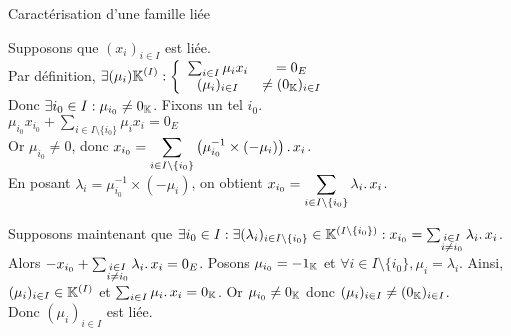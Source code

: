 \documentclass{article}
\renewenvironment{question_kholle}[2][ ]
{
	\subsection{\texorpdfstring{#2}{}}
	\notblank{#1}
	{
		\noindent #1
		\bigbreak
	}
	{}
	\begin{proof}
}
{
	\end{proof}
}
\begin{document}
\begin{question_kholle}
	[Une famille est liée si et seulement si l'un de ses vecteurs est une combinaison linéaires d'autres vecteurs de la famille.
		\begin{equation}
			(x_i)_{i \in I} \text{ est liée}
			\iff \exists i_0 \in I : \exists (\lambda_i)_{i \in I\setminus\{i_0\}} \in \K^{\left( I \setminus \{i_0\} \right)} :
			x_{i_0} = \sum_{\substack{i \in I \\ i \neq i_0}} \lambda_i \ldotp x_i
		\end{equation}]
	{Caractérisation d'une famille liée}

	Supposons que $(x_i)_{i \in I}$ est liée. \\
	Par définition, $\displaystyle \exists (\mu_i) \mathbb K^{(I)} :
		\left\{ \begin{array}{ccc}
			\sum_{i \in I} \mu_i x_i & = 0_E                 \\
			(\mu_i)_{i \in I}        & \neq (0_{\mathbb K})_{i \in I}
		\end{array} \right.$ \\
	Donc $\exists i_0 \in I : \mu_{i_0} \neq 0_{\mathbb K}$. Fixons un tel $i_0$. \\
	$\displaystyle \mu_{i_0} x_{i_0} + \sum_{i \in I \setminus \{i_0\}} \mu_i x_i = 0_E$ \\
	Or $\mu_{i_0} \neq 0$, donc $\displaystyle x_{i_0} = \sum_{i \in I \setminus \{i_0\}} \left( \mu_{i_0}^{-1} \times (-\mu_i) \right) \ldotp x_i$. \\
	En posant $\lambda_i = \mu_{i_0}^{-1} \times (-\mu_i)$, on obtient $x_{i_0} = \displaystyle \sum_{i \in I \setminus \{i_0\}} \lambda_i \ldotp x_i$.

	Supposons maintenant que $\exists i_0 \in I : \exists (\lambda_i)_{i \in I\setminus\{i_0\}} \in \mathbb K^{\left( I \setminus \{i_0\} \right)} :
		x_{i_0} = \sum_{\substack{i \in I \\ i \neq i_0}} \lambda_i \ldotp x_i$. \\
	Alors $-x_{i_0} + \sum_{\substack{i \in I \\ i \neq i_0}} \lambda_i \ldotp x_i = 0_E$.
	Posons $\mu_{i_0} = - 1_{\mathbb K}$ et $\forall i \in I \!\setminus\! \{i_0\}, \mu_i = \lambda_i$.
	Ainsi, $(\mu_i)_{i \in I} \in \mathbb K^{(I)}$ et $\sum_{i \in I} \mu_i \ldotp x_i = 0_{\mathbb K}$. Or $\mu_{i_0} \neq 0_{\mathbb K}$ donc $(\mu_i)_{i \in I} \neq (0_{\mathbb K})_{i \in I}$. \\
	Donc $(\mu_i)_{i \in I}$ est liée.
\end{question_kholle}
\end{document}
